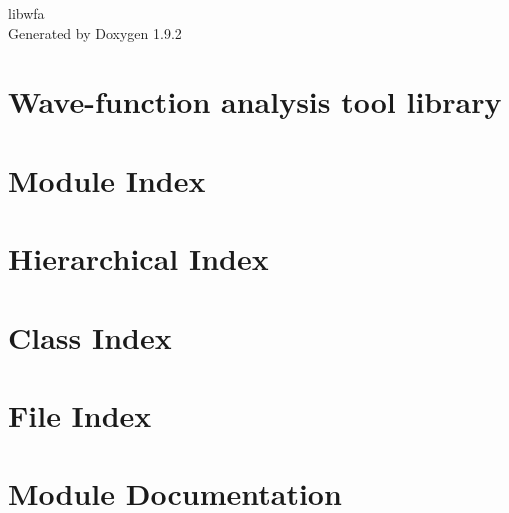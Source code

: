 \documentclass[twoside]{book}
\newcommand{\+}{\discretionary{\mbox{\scriptsize$\hookleftarrow$}}{}{}}
\newcommand{\clearemptydoublepage}{%
    \newpage{\pagestyle{empty}\cleardoublepage}%
  }
\begin{document}
  \raggedbottom
    \hypersetup{pageanchor=false,
                bookmarksnumbered=true,
                pdfencoding=unicode
               }
  \begin{titlepage}
  \vspace*{7cm}
  \begin{center}%
  {\Large libwfa}\\
  \vspace*{1cm}
  {\large Generated by Doxygen 1.9.2}\\
  \end{center}
  \end{titlepage}
  \clearemptydoublepage
  \tableofcontents
  \clearemptydoublepage
  \hypersetup{pageanchor=true}
\chapter{Wave-\/function analysis tool library}
\label{index}\hypertarget{index}{}
\chapter{Module Index}

\chapter{Hierarchical Index}

\chapter{Class Index}

\chapter{File Index}

\chapter{Module Documentation}


\end{document}
